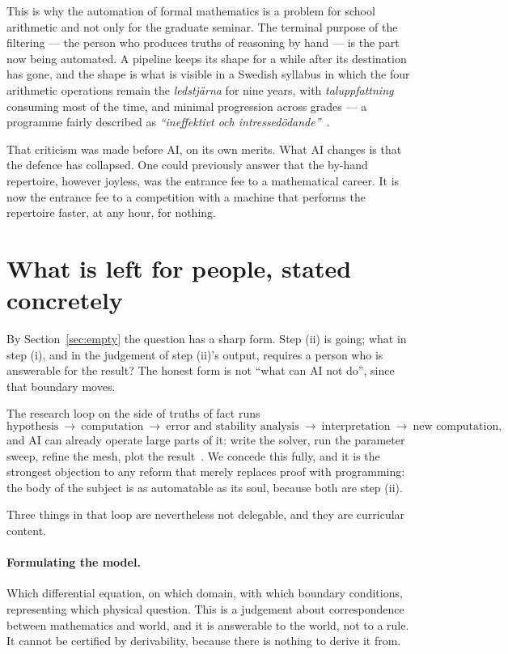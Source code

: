 \documentclass[11pt]{article}
\begin{document}
This is why the automation of formal mathematics is a problem for school arithmetic and not only
for the graduate seminar. The terminal purpose of the filtering --- the person who produces truths
of reasoning by hand --- is the part now being automated. A pipeline keeps its shape for a while
after its destination has gone, and the shape is what is visible in a Swedish syllabus in which the
four arithmetic operations remain the \emph{ledstjärna} for nine years, with \emph{taluppfattning}
consuming most of the time, and minimal progression across grades --- a programme fairly described
as \emph{``ineffektivt och intressedödande''}~\cite{leibnizvs}.

That criticism was made before AI, on its own merits. What AI changes is that the defence has
collapsed. One could previously answer that the by-hand repertoire, however joyless, was the
entrance fee to a mathematical career. It is now the entrance fee to a competition with a machine
that performs the repertoire faster, at any hour, for nothing.

\section{What is left for people, stated concretely}\label{sec:left}

By Section~\ref{sec:empty} the question has a sharp form. Step (ii) is going; what in step (i),
and in the judgement of step (ii)'s output, requires a person who is answerable for the result? The
honest form is not ``what can AI not do'', since that boundary moves.

The research loop on the side of truths of fact runs
\[
\text{hypothesis}\ \rightarrow\ \text{computation}\ \rightarrow\ \text{error and stability
analysis}\ \rightarrow\ \text{interpretation}\ \rightarrow\ \text{new computation},
\]
and AI can already operate large parts of it: write the solver, run the parameter sweep, refine the
mesh, plot the result~\cite{aicompmath}. We concede this fully, and it is the strongest objection to
any reform that merely replaces proof with programming: the body of the subject is as automatable as
its soul, because both are step (ii).

Three things in that loop are nevertheless not delegable, and they are curricular content.

\paragraph{Formulating the model.} Which differential equation, on which domain, with which boundary
conditions, representing which physical question. This is a judgement about correspondence between
mathematics and world, and it is answerable to the world, not to a rule. It cannot be certified by
derivability, because there is nothing to derive it from.
\end{document}
